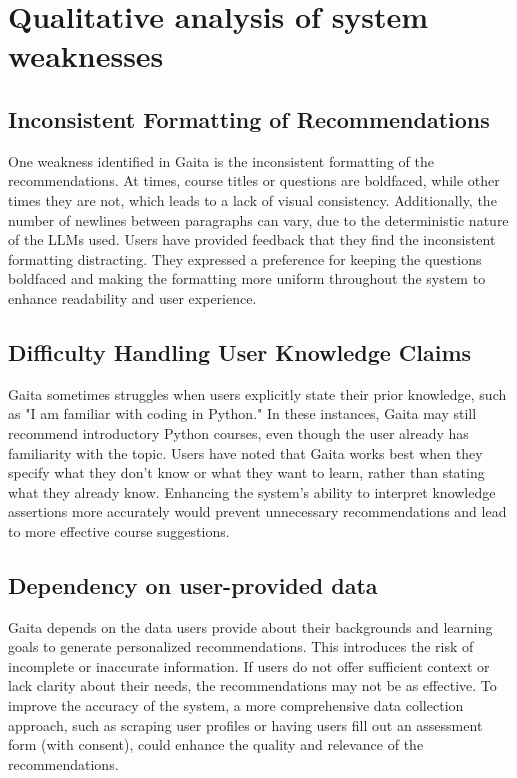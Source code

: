 \section{Qualitative analysis of system weaknesses}

\subsection{Inconsistent Formatting of Recommendations}

One weakness identified in Gaita is the inconsistent formatting of the recommendations. At times, course titles or questions are boldfaced, while other times they are not, which leads to a lack of visual consistency. Additionally, the number of newlines between paragraphs can vary, due to the deterministic nature of the LLMs used. Users have provided feedback that they find the inconsistent formatting distracting. They expressed a preference for keeping the questions boldfaced and making the formatting more uniform throughout the system to enhance readability and user experience.

\subsection{Difficulty Handling User Knowledge Claims}

Gaita sometimes struggles when users explicitly state their prior knowledge, such as "I am familiar with coding in Python." In these instances, Gaita may still recommend introductory Python courses, even though the user already has familiarity with the topic. Users have noted that Gaita works best when they specify what they don't know or what they want to learn, rather than stating what they already know. Enhancing the system’s ability to interpret knowledge assertions more accurately would prevent unnecessary recommendations and lead to more effective course suggestions.

\subsection{Dependency on user-provided data}

Gaita depends on the data users provide about their backgrounds and learning goals to generate personalized recommendations. This introduces the risk of incomplete or inaccurate information. If users do not offer sufficient context or lack clarity about their needs, the recommendations may not be as effective. To improve the accuracy of the system, a more comprehensive data collection approach, such as scraping user profiles or having users fill out an assessment form (with consent), could enhance the quality and relevance of the recommendations.

